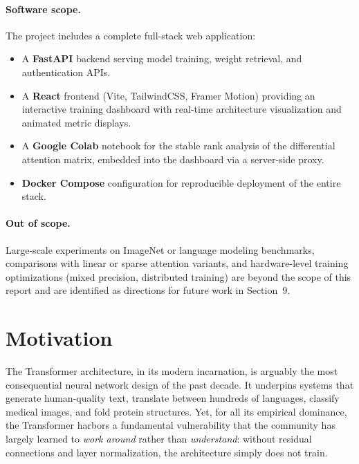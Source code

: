 \documentclass[12pt, a4paper]{article}
\begin{document}
\paragraph{Software scope.}
The project includes a complete full-stack web application:
\begin{itemize}[leftmargin=1.5em]
    \item A \textbf{FastAPI} backend serving model training, weight
          retrieval, and authentication APIs.
    \item A \textbf{React} frontend (Vite, TailwindCSS, Framer Motion)
          providing an interactive training dashboard with real-time
          architecture visualization and animated metric displays.
    \item A \textbf{Google Colab} notebook for the stable rank analysis
          of the differential attention matrix, embedded into the
          dashboard via a server-side proxy.
    \item \textbf{Docker Compose} configuration for reproducible
          deployment of the entire stack.
\end{itemize}

\paragraph{Out of scope.}
Large-scale experiments on ImageNet or language modeling benchmarks,
comparisons with linear or sparse attention variants, and hardware-level
training optimizations (mixed precision, distributed training) are
beyond the scope of this report and are identified as directions for
future work in Section~9.

\section{Motivation}

The Transformer architecture, in its modern incarnation, is arguably the
most consequential neural network design of the past decade. It underpins
systems that generate human-quality text, translate between hundreds of
languages, classify medical images, and fold protein structures. Yet, for
all its empirical dominance, the Transformer harbors a fundamental
vulnerability that the community has largely learned to \textit{work around}
rather than \textit{understand}: without residual connections and layer
normalization, the architecture simply does not train.
\end{document}
